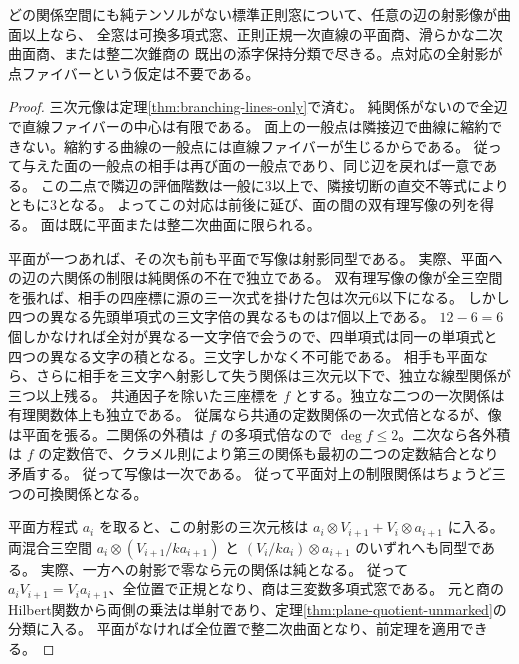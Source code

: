 \begin{corollary}\label{cor:pure-free-surface-complete}
どの関係空間にも純テンソルがない標準正則窓について、任意の辺の射影像が曲面以上なら、
全窓は可換多項式窓、正則正規一次直線の平面商、滑らかな二次曲面商、または整二次錐商の
既出の添字保持分類で尽きる。点対応の全射影が点ファイバーという仮定は不要である。
\end{corollary}
\begin{proof}
三次元像は定理\ref{thm:branching-lines-only}で済む。
純関係がないので全辺で直線ファイバーの中心は有限である。
面上の一般点は隣接辺で曲線に縮約できない。縮約する曲線の一般点には直線ファイバーが生じるからである。
従って与えた面の一般点の相手は再び面の一般点であり、同じ辺を戻れば一意である。
この二点で隣辺の評価階数は一般に3以上で、隣接切断の直交不等式によりともに3となる。
よってこの対応は前後に延び、面の間の双有理写像の列を得る。
面は既に平面または整二次曲面に限られる。

平面が一つあれば、その次も前も平面で写像は射影同型である。
実際、平面への辺の六関係の制限は純関係の不在で独立である。
双有理写像の像が全三空間を張れば、相手の四座標に源の三一次式を掛けた包は次元6以下になる。
しかし四つの異なる先頭単項式の三文字倍の異なるものは7個以上である。
$12-6=6$ 個しかなければ全対が異なる一文字倍で会うので、四単項式は同一の単項式と
四つの異なる文字の積となる。三文字しかなく不可能である。
相手も平面なら、さらに相手を三文字へ射影して失う関係は三次元以下で、独立な線型関係が三つ以上残る。
共通因子を除いた三座標を $f$ とする。独立な二つの一次関係は有理関数体上も独立である。
従属なら共通の定数関係の一次式倍となるが、像は平面を張る。二関係の外積は $f$ の多項式倍なので
$\deg f\le2$。二次なら各外積は $f$ の定数倍で、クラメル則により第三の関係も最初の二つの定数結合となり矛盾する。
従って写像は一次である。
従って平面対上の制限関係はちょうど三つの可換関係となる。

平面方程式 $a_i$ を取ると、この射影の三次元核は
$a_i\otimes V_{i+1}+V_i\otimes a_{i+1}$ に入る。
両混合三空間 $a_i\otimes(V_{i+1}/ka_{i+1})$ と $(V_i/ka_i)\otimes a_{i+1}$ のいずれへも同型である。
実際、一方への射影で零なら元の関係は純となる。
従って $a_i V_{i+1}=V_i a_{i+1}$、全位置で正規となり、商は三変数多項式窓である。
元と商のHilbert関数から両側の乗法は単射であり、定理\ref{thm:plane-quotient-unmarked}の分類に入る。
平面がなければ全位置で整二次曲面となり、前定理を適用できる。
\end{proof}
